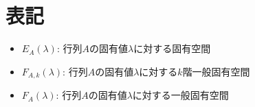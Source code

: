 \chapter{表記}
    \begin{itemize}
        \item $E_A(\lambda)$: 行列$A$の固有値$\lambda$に対する固有空間
        \item $F_{A,k}(\lambda)$: 行列$A$の固有値$\lambda$に対する$k$階一般固有空間
        \item $F_A(\lambda)$: 行列$A$の固有値$\lambda$に対する一般固有空間
    \end{itemize}
